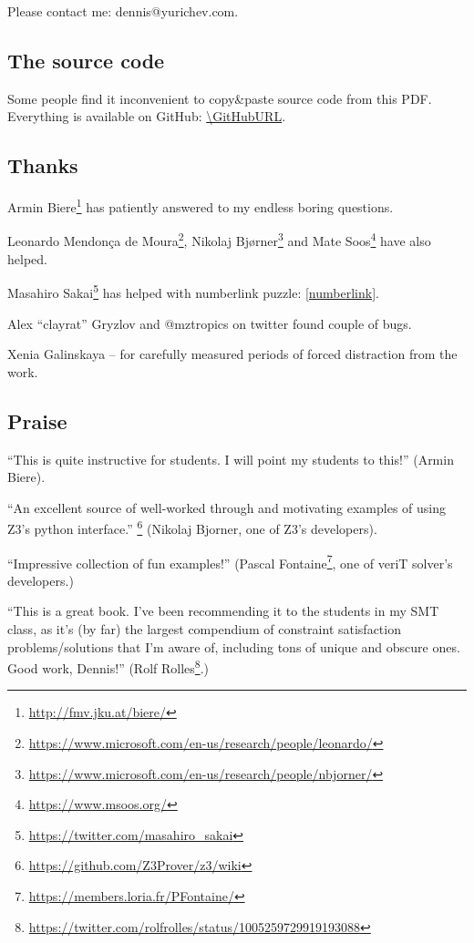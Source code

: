 Please contact me: dennis@yurichev.com.
\fi

\subsection{The source code}

Some people find it inconvenient to copy\&paste source code from this PDF.
Everything is available on GitHub: \url{\GitHubURL}.

\subsection{Thanks}

Armin Biere\footnote{\url{http://fmv.jku.at/biere/}} has patiently answered to my endless boring questions.

Leonardo Mendonça de Moura\footnote{\url{https://www.microsoft.com/en-us/research/people/leonardo/}},
Nikolaj Bjørner\footnote{\url{https://www.microsoft.com/en-us/research/people/nbjorner/}}
and Mate Soos\footnote{\url{https://www.msoos.org/}} have also helped.

Masahiro Sakai\footnote{\url{https://twitter.com/masahiro_sakai}} has helped with numberlink puzzle: \ref{numberlink}.

Alex ``clayrat'' Gryzlov and @mztropics on twitter found couple of bugs.

Xenia Galinskaya -- for carefully measured periods of forced distraction from the work.

\subsection{Praise}

``This is quite instructive for students. I will point my students to this!'' (Armin Biere).

``An excellent source of well-worked through and motivating examples of using Z3's python interface.''
\footnote{\url{https://github.com/Z3Prover/z3/wiki}}
(Nikolaj Bjorner, one of Z3's developers).

``Impressive collection of fun examples!''
(Pascal Fontaine\footnote{\url{https://members.loria.fr/PFontaine/}}, one of veriT solver's developers.)

``This is a great book. I've been recommending it to the students in my SMT class, as it's (by far) the largest compendium of constraint satisfaction problems/solutions that I'm aware of, including tons of unique and obscure ones. Good work, Dennis!''
(Rolf Rolles\footnote{\url{https://twitter.com/rolfrolles/status/1005259729919193088}}.)

